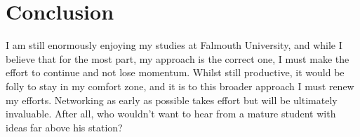 \documentclass{scrartcl}
\begin{document}
\section*{Conclusion}

I am still enormously enjoying my studies at Falmouth University, and while I believe that for the most part, my approach is the correct one, I must make the effort to continue and not lose momentum. Whilst still productive, it would be folly to stay in my comfort zone, and it is to this broader approach I must renew my efforts. Networking as early as possible takes effort but will be ultimately invaluable. After all, who wouldn't want to hear from a mature student with ideas far above his station?
\end{document}
